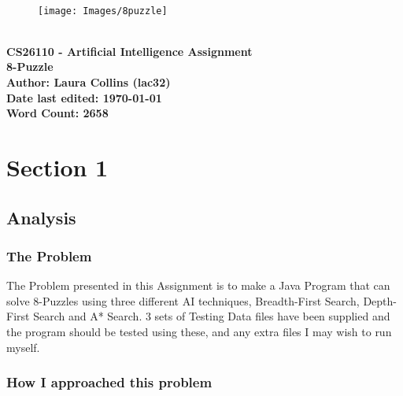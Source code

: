\documentclass[11pt]{article} %
\begin{document}
	\begin{titlepage}
		\begin{center}


		 ~ \\[0.4cm]

		\begin{figure}[ht!]
			\centering
			\texttt{[image: Images/8puzzle]}
			\label{overflow}
		\end{figure} ~ \\[0.4cm]



		\bfseries{\LARGE{CS26110 - Artificial Intelligence Assignment}} \\[0.5cm]

		\Large{8-Puzzle}\\[1cm]

		\Large{Author: Laura Collins (lac32)}\\[0.5cm]

		\Large {Date last edited: \today} \\[0.5cm]

		\Large {Word Count: 2658}

		\end{center}
	\end{titlepage}

\newpage
	\tableofcontents

	\newpage
		\section{Section 1}
	
			\subsection{Analysis}
	
				\subsubsection{The Problem}
	
					The Problem presented in this Assignment is to make a Java Program that can solve 8-Puzzles using three different AI techniques, Breadth-First Search, Depth-First Search and A* Search. 3 sets of Testing Data files have been supplied and the program should be tested using these, and any extra files I may wish to run myself.
	
				\subsubsection{How I approached this problem}
	
\end{document}
